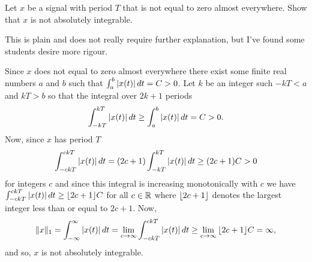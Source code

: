 \begin{excersizelist}
\item Let $x$ be a signal with period $T$ that is not equal to zero almost everywhere.  Show that $x$ is not absolutely integrable.
\begin{solution}
This is plain and does not really require further explanation, but I've found some students desire more rigour.  

Since $x$ does not equal to zero almost everywhere there exist some finite real numbers $a$ and $b$  such that $\int_{a}^b \left\vert x(t) \right\vert dt = C > 0$.  Let $k$ be an integer such $-kT < a$ and $kT > b$ so that the integral over $2k+1$ periods 
\[
\int_{-kT}^{kT}\left\vert x(t) \right\vert dt \geq \int_{a}^b \left\vert x(t) \right\vert dt = C > 0.
\] 
Now, since $x$ has period $T$
\[
\int_{-ckT}^{ckT}\left\vert x(t) \right\vert dt = (2c+1) \int_{-kT}^{kT}\left\vert x(t) \right\vert dt \geq (2c+1)C > 0
\] 
for integers $c$ and since this integral is increasing monotonically with $c$ we have $\int_{-ckT}^{ckT}\left\vert x(t) \right\vert dt \geq {\left\lfloor 2c+1 \right\rfloor}C$ for all $c \in {\mathbb R}$ where ${\left\lfloor 2c+1 \right\rfloor}$ denotes the largest integer less than or equal to $2c+1$.  Now,
\[
\|x\|_1 = \int_{-\infty}^{\infty} \left\vert x(t) \right\vert dt = \lim_{c \to \infty} \int_{-ckT}^{ckT}\left\vert x(t) \right\vert dt \geq \lim_{c \to \infty} {\left\lfloor 2c+1 \right\rfloor}C = \infty,
\]
and so, $x$ is not absolutely integrable.

\end{solution}

\end{excersizelist}



